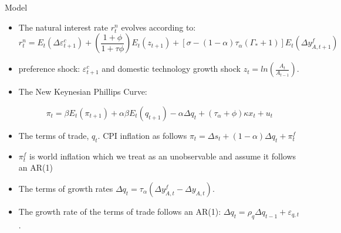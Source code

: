 \documentclass[9pt]{beamer}
\begin{document}
\begin{frame}{Model}
\begin{itemize}
\item The natural interest rate $r_t^{n}$ evolves according to:
\begin{equation*}
    r_t^{n} = E_t(\Delta \varepsilon_{t+1}^{c}) + \left( \frac{1 + \phi}{1 + \tau \phi} \right)E_t(z_{t+1}) + \left[\sigma -(1 - \alpha)\tau_{\alpha}(\Gamma_{*}+1)   \right]E_t(\Delta y_{A,t+1}^{f})
\end{equation*}

\item preference shock: $\varepsilon_{t+1}^{c}$ and domestic technology
growth shock $z_t = ln\left( \frac{A_t}{A_{t-1}} \right)$.

\item The New Keynesian Phillips Curve:

\begin{equation*}
    \pi_t = \beta E_t(\pi_{t+1} ) + \alpha \beta E_t(q_{t+1}) - \alpha \Delta q_t + (\tau_{\alpha} + \phi) \kappa x_t + u_t
\end{equation*}

\item The terms of trade, $q_t$. CPI inflation as follows $\pi_t = \Delta s_t + (1 - \alpha) \Delta q_t + \pi_t^{f} $

\item $\pi_t^{f}$ is world inflation which we treat as an unobservable and assume it follows an  AR(1)

\item The terms of growth rates $\Delta q_t = \tau_{\alpha}(\Delta y_{A,t}^{f} - \Delta y_{A,t})$.

\item The growth rate of the terms of trade follows an AR(1): $\Delta q_t = \rho_q \Delta q_{t-1} + \varepsilon_{q,t}$.


\end{itemize}
\end{frame}
\end{document}
